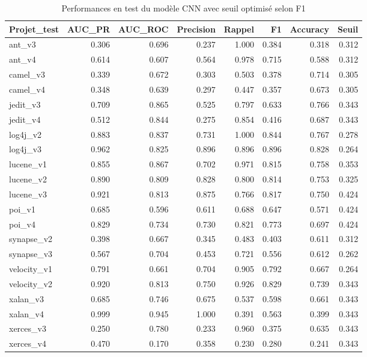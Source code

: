 \begin{table}
\caption{Performances en test du modèle CNN avec seuil optimisé selon F1}
\label{tab:cnn_f1}
\begin{tabular}{lrrrrrrr}
\toprule
Projet_test & AUC_PR & AUC_ROC & Precision & Rappel & F1 & Accuracy & Seuil \\
\midrule
ant_v3 & 0.306 & 0.696 & 0.237 & 1.000 & 0.384 & 0.318 & 0.312 \\
ant_v4 & 0.614 & 0.607 & 0.564 & 0.978 & 0.715 & 0.588 & 0.312 \\
camel_v3 & 0.339 & 0.672 & 0.303 & 0.503 & 0.378 & 0.714 & 0.305 \\
camel_v4 & 0.348 & 0.639 & 0.297 & 0.447 & 0.357 & 0.673 & 0.305 \\
jedit_v3 & 0.709 & 0.865 & 0.525 & 0.797 & 0.633 & 0.766 & 0.343 \\
jedit_v4 & 0.512 & 0.844 & 0.275 & 0.854 & 0.416 & 0.687 & 0.343 \\
log4j_v2 & 0.883 & 0.837 & 0.731 & 1.000 & 0.844 & 0.767 & 0.278 \\
log4j_v3 & 0.962 & 0.825 & 0.896 & 0.896 & 0.896 & 0.828 & 0.264 \\
lucene_v1 & 0.855 & 0.867 & 0.702 & 0.971 & 0.815 & 0.758 & 0.353 \\
lucene_v2 & 0.890 & 0.809 & 0.828 & 0.800 & 0.814 & 0.753 & 0.325 \\
lucene_v3 & 0.921 & 0.813 & 0.875 & 0.766 & 0.817 & 0.750 & 0.424 \\
poi_v1 & 0.685 & 0.596 & 0.611 & 0.688 & 0.647 & 0.571 & 0.424 \\
poi_v4 & 0.829 & 0.734 & 0.730 & 0.821 & 0.773 & 0.697 & 0.424 \\
synapse_v2 & 0.398 & 0.667 & 0.345 & 0.483 & 0.403 & 0.611 & 0.312 \\
synapse_v3 & 0.567 & 0.704 & 0.453 & 0.721 & 0.556 & 0.612 & 0.262 \\
velocity_v1 & 0.791 & 0.661 & 0.704 & 0.905 & 0.792 & 0.667 & 0.264 \\
velocity_v2 & 0.920 & 0.813 & 0.750 & 0.926 & 0.829 & 0.739 & 0.343 \\
xalan_v3 & 0.685 & 0.746 & 0.675 & 0.537 & 0.598 & 0.661 & 0.343 \\
xalan_v4 & 0.999 & 0.945 & 1.000 & 0.391 & 0.563 & 0.399 & 0.343 \\
xerces_v3 & 0.250 & 0.780 & 0.233 & 0.960 & 0.375 & 0.635 & 0.343 \\
xerces_v4 & 0.470 & 0.170 & 0.358 & 0.230 & 0.280 & 0.241 & 0.343 \\
\bottomrule
\end{tabular}
\end{table}
